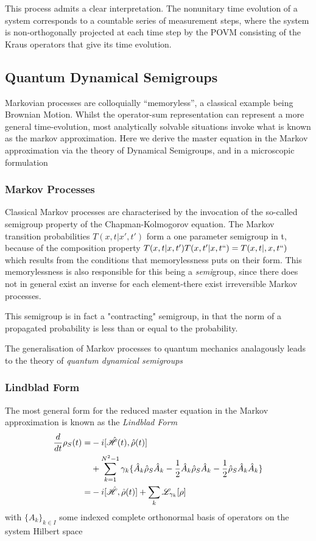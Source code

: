 This process admits a clear interpretation.
The nonunitary time evolution of a system corresponds to a countable series of measurement steps, where the system is non-orthogonally projected at each time step by the POVM consisting of the Kraus operators that give its time evolution.

\subsection{Quantum Dynamical Semigroups}
Markovian processes are colloquially ``memoryless'', a classical example being Brownian Motion.
Whilst the operator-sum representation can represent a more general time-evolution, most analytically solvable situations invoke what is known as the markov approximation.
Here we derive the master equation in the Markov approximation via the theory of Dynamical Semigroups, and in a microscopic formulation

\subsubsection{Markov Processes}
Classical Markov processes are characterised by the invocation of the so-called semigroup property of the Chapman-Kolmogorov equation.
The Markov transition probabilities $T(x, t|x', t')$ form a one parameter semigroup in t, because of the composition property $T(x, t|x, t')T(x, t'|x, t``) = T(x, t|,x, t``)$ which results from the conditions that memorylessness puts on their form.
This memorylessness is also responsible for this being a \emph{semi}group, since there does not in general exist an inverse for each element-there exist irreversible Markov processes.

This semigroup is in fact a "contracting" semigroup, in that the norm of a propagated probability is less than or equal to the probability.

The generalisation of Markov processes to quantum mechanics analagously leads to the theory of \emph{quantum dynamical semigroups}

\subsubsection{Lindblad Form}
The most general form\cite[119--122]{Breuer2002} for the reduced master equation in the Markov approximation is known as the \emph{Lindblad Form}
\begin{align}
        \frac{d}{dt} \rho_S (t) =& -i[\hat{\mathscr{H}} (t), \hat{\rho} (t)\notag]\\
                                 & + \sum_{k=1}^{N^2-1} \gamma_k \{ \hat{A}_k \hat{\rho}_S \hat{A}_k -\frac{1}{2}  \hat{A}_k \hat{\rho}_S \hat{A}_k -\frac{1}{2} \hat{\rho}_S \hat{A}_k \hat{A}_k \}\\
        = & -i[\hat{\mathscr{H}}, \hat{\rho}(t)]+ \sum_k \mathscr{L}_{\gamma_{k}} [\rho]
\end{align}
with ${\{A_k\}}_{k \in I}$ some indexed complete orthonormal basis of operators on the system Hilbert space

